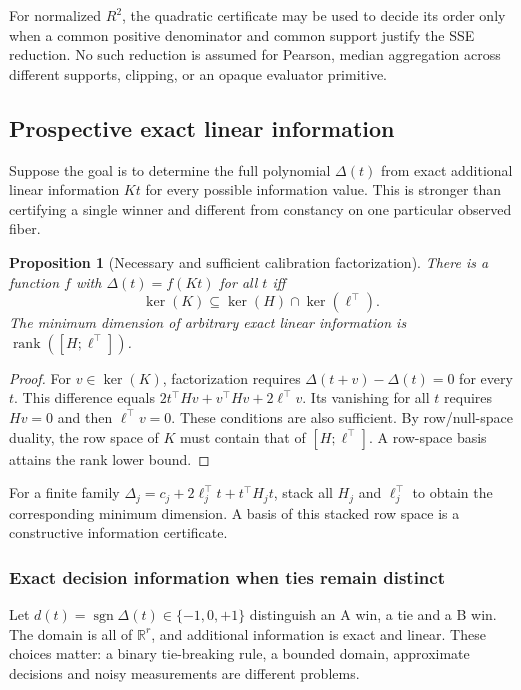 \documentclass[11pt]{article}
\newtheorem{proposition}{Proposition}
\DeclareMathOperator{\rank}{rank}\DeclareMathOperator{\kerop}{ker}
\begin{document}
For normalized $R^2$, the quadratic certificate may be used to decide its order only when a common positive denominator and common support justify the SSE reduction. No such reduction is assumed for Pearson, median aggregation across different supports, clipping, or an opaque evaluator primitive.


\subsection{Prospective exact linear information}
Suppose the goal is to determine the full polynomial $\Delta(t)$ from exact additional linear information $Kt$ for every possible information value. This is stronger than certifying a single winner and different from constancy on one particular observed fiber.

\begin{proposition}[Necessary and sufficient calibration factorization]
There is a function $f$ with $\Delta(t)=f(Kt)$ for all $t$ iff
\[
\ker(K)\subseteq\ker(H)\cap\ker(\ell^\top).
\]
The minimum dimension of arbitrary exact linear information is $\rank([H;\ell^\top])$.
\end{proposition}
\begin{proof}
For $v\in\ker(K)$, factorization requires $\Delta(t+v)-\Delta(t)=0$ for every $t$. This difference equals $2t^\top Hv+v^\top Hv+2\ell^\top v$. Its vanishing for all $t$ requires $Hv=0$ and then $\ell^\top v=0$. These conditions are also sufficient. By row/null-space duality, the row space of $K$ must contain that of $[H;\ell^\top]$. A row-space basis attains the rank lower bound.
\end{proof}
For a finite family $\Delta_j=c_j+2\ell_j^\top t+t^\top H_jt$, stack all $H_j$ and $\ell_j^\top$ to obtain the corresponding minimum dimension. A basis of this stacked row space is a constructive information certificate.

\subsubsection{Exact decision information when ties remain distinct}
Let $d(t)=\operatorname{sgn}\Delta(t)\in\{-1,0,+1\}$ distinguish an A win, a tie and a B win. The domain is all of $\mathbb R^r$, and additional information is exact and linear. These choices matter: a binary tie-breaking rule, a bounded domain, approximate decisions and noisy measurements are different problems.
\end{document}
